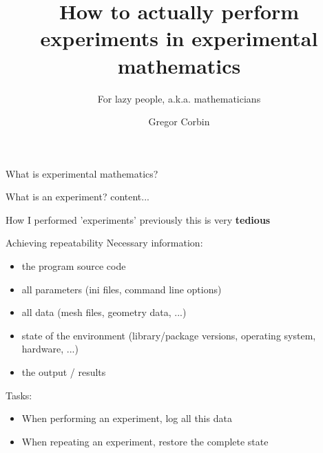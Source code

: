\documentclass[11pt]{beamer}
\author{Gregor Corbin}
\title{How to actually perform experiments in experimental mathematics}
\subtitle{For lazy people, a.k.a. mathematicians}
\institute{}
\date{}
\begin{document}
	\maketitle
	
	\begin{frame}{What is experimental mathematics?}
	
	\end{frame}
	
	\begin{frame}{What is an experiment?}
		content...
	\end{frame}
	
	\begin{frame}{How I performed 'experiments' previously}
		this is very \textbf{tedious}
	\end{frame}
	
	\begin{frame}{Achieving repeatability}
		Necessary information:
		\begin{itemize}
			\item the program source code
			\item all parameters (ini files, command line options)
			\item all data (mesh files, geometry data, ...)
			\item state of the environment (library/package versions, operating system, hardware, ...)
			\item the output / results 
		\end{itemize}

		Tasks: 
		\begin{itemize}
			\item When performing an experiment, log all this data
			\item When repeating an experiment, restore the complete state
		\end{itemize}
	\end{frame}
	
\end{document}
